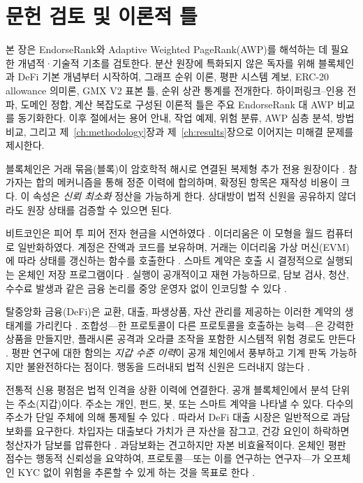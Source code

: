 ﻿%
\chapter{문헌 검토 및 이론적 틀}
\label{ch:literature}

본 장은 EndorseRank와 Adaptive Weighted PageRank(AWP)를 해석하는 데 필요한 개념적·기술적 기초를 검토한다. 분산 원장에 특화되지 않은 독자를 위해 블록체인과 DeFi 기본 개념부터 시작하여, 그래프 순위 이론, 평판 시스템 계보, ERC-20 allowance 의미론, GMX V2 표본 틀, 순위 상관 통계를 전개한다. 하이퍼링크--인용 전파, 도메인 정합, 계산 복잡도로 구성된 이론적 틀은 주요 EndorseRank 대 AWP 비교를 동기화한다. 이후 절에서는 용어 안내, 작업 예제, 위험 분류, AWP 심층 분석, 방법 비교, 그리고 제~\ref{ch:methodology}장과 제~\ref{ch:results}장으로 이어지는 미해결 문제를 제시한다.


블록체인은 거래 묶음(블록)이 암호학적 해시로 연결된 복제형 추가 전용 원장이다 . 참가자는 합의 메커니즘을 통해 정준 이력에 합의하며, 확정된 항목은 재작성 비용이 크다. 이 속성은 \emph{신뢰 최소화} 정산을 가능하게 한다. 상대방이 법적 신원을 공유하지 않더라도 원장 상태를 검증할 수 있으면 된다.

비트코인은 피어 투 피어 전자 현금을 시연하였다 . 이더리움은 이 모형을 월드 컴퓨터로 일반화하였다. 계정은 잔액과 코드를 보유하며, 거래는 이더리움 가상 머신(EVM)에 따라 상태를 갱신하는 함수를 호출한다 . 스마트 계약은 호출 시 결정적으로 실행되는 온체인 저장 프로그램이다 . 실행이 공개적이고 재현 가능하므로, 담보 검사, 청산, 수수료 발생과 같은 금융 논리를 중앙 운영자 없이 인코딩할 수 있다 .

탈중앙화 금융(DeFi)은 교환, 대출, 파생상품, 자산 관리를 제공하는 이러한 계약의 생태계를 가리킨다 . 조합성---한 프로토콜이 다른 프로토콜을 호출하는 능력---은 강력한 상품을 만들지만, 플래시론 공격과 오라클 조작을 포함한 시스템적 위험 경로도 만든다 . 평판 연구에 대한 함의는 \emph{지갑 수준 이력}이 공개 체인에서 풍부하고 기계 판독 가능하지만 불완전하다는 점이다. 행동을 드러내되 법적 신원은 드러내지 않는다 .


전통적 신용 평점은 법적 인격을 상환 이력에 연결한다. 공개 블록체인에서 분석 단위는 주소(지갑)이다. 주소는 개인, 펀드, 봇, 또는 스마트 계약을 나타낼 수 있다. 다수의 주소가 단일 주체에 의해 통제될 수 있다 . 따라서 DeFi 대출 시장은 일반적으로 과담보화를 요구한다. 차입자는 대출보다 가치가 큰 자산을 잠그고, 건강 요인이 하락하면 청산자가 담보를 압류한다 . 과담보화는 견고하지만 자본 비효율적이다. 온체인 평판 점수는 행동적 신뢰성을 요약하여, 프로토콜---또는 이를 연구하는 연구자---가 오프체인 KYC 없이 위험을 추론할 수 있게 하는 것을 목표로 한다 .

